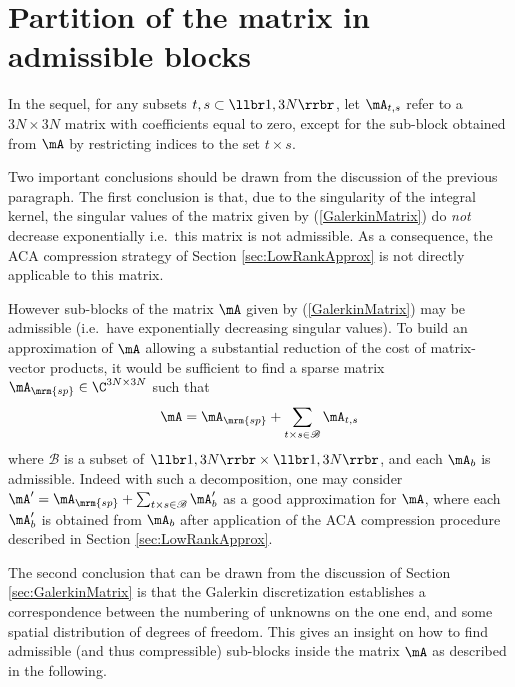 


\section{Partition of the matrix in admissible blocks}
\label{section:partition}

In the sequel, for any subsets $t,s\subset \llbr1,3N\rrbr$, let $\mA_{t,s}$ refer to a $3N \times 3N$ matrix with coefficients equal to zero, except for the sub-block obtained from $\mA$ 
by restricting indices to the set $t\times s$. 

\bigskip
Two important conclusions should be drawn from the discussion of the previous paragraph. The first 
conclusion is that, due to the singularity of the integral kernel, the singular values of the matrix given 
by (\ref{GalerkinMatrix}) do \textit{not} decrease exponentially i.e.~this matrix is not admissible. 
As a consequence, the ACA compression strategy of Section \ref{sec:LowRankApprox} is not directly applicable 
to this matrix. 

\bigskip
However sub-blocks of the matrix $\mA$ given by (\ref{GalerkinMatrix}) may be admissible (i.e.~have exponentially 
decreasing singular values). To build an approximation of $\mA$ allowing a substantial reduction of the cost of 
matrix-vector products, it would be sufficient to find a sparse matrix $\mA_{\mrm{sp}}\in \C^{3N\times 3N}$ such that 
\begin{align}
\mA = \mA_{\mrm{sp}} + \sum_{t\times s\in \mathscr{B}} \mA_{t,s}
\label{eq:decomposition}
\end{align}
where $\mathscr{B}$ is a subset of $\llbr 1,3N\rrbr\times \llbr 1,3N\rrbr$, and each 
$\mA_{b}$ is admissible. Indeed with such a decomposition, one may consider $\mA' = \mA_{\mrm{sp}} + \sum_{t\times s\in \mathscr{B}} \mA_{b}'$
as a good approximation for $\mA$, where each $\mA_{b}'$ is obtained from $\mA_{b}$ after application of the ACA compression 
procedure described in Section \ref{sec:LowRankApprox}. 



\bigskip
The second conclusion that can be drawn from the discussion of Section \ref{sec:GalerkinMatrix} is that the Galerkin discretization establishes 
a correspondence between the numbering of unknowns on the one end, and some spatial distribution of degrees of freedom. This gives an insight 
on how to find admissible (and thus compressible) sub-blocks inside the matrix $\mA$ as described in the following.

